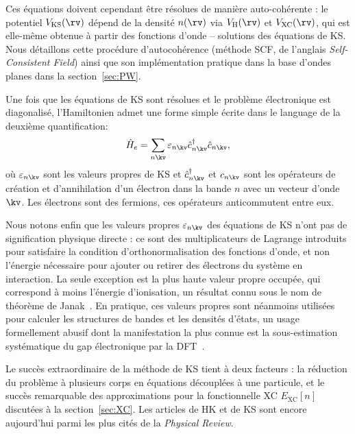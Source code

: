 Ces équations doivent cependant être résolues de manière auto-cohérente : le potentiel $V_\text{KS}(\rv)$ dépend de la densité $n(\rv)$ via $V_\text{H}(\rv)$ et $V_\text{XC}(\rv)$, qui est elle-même obtenue à partir des fonctions d'onde -- solutions des équations de KS. Nous détaillons cette procédure d'autocohérence (méthode SCF, de l'anglais \textit{Self-Consistent Field}) ainsi que son implémentation pratique dans la base d'ondes planes dans la section~\ref{sec:PW}.

Une fois que les équations de KS sont résolues et le problème électronique est diagonalisé, l'Hamiltonien admet une forme simple écrite dans le language de la deuxième quantification:
\begin{equation}
    \hat{H}_e = \sum_{n\kv}\varepsilon_{n\kv}\hat{c}^\dag_{n\kv}\hat{c}_{n\kv},
\end{equation}
où $\varepsilon_{n\kv}$ sont les valeurs propres de KS et $\hat{c}^\dag_{n\kv}$ et $c_{n\kv}$ sont les opérateurs de création et d'annihilation d'un électron dans la bande $n$ avec un vecteur d'onde $\kv$. Les électrons sont des fermions, ces opérateurs anticommutent entre eux. 

Nous notons enfin que les valeurs propres $\varepsilon_{n\kv}$ des équations de KS n'ont pas de signification physique directe : ce sont des multiplicateurs de Lagrange introduits pour satisfaire la condition d'orthonormalisation des fonctions d'onde, et non l'énergie nécessaire pour ajouter ou retirer des électrons du système en interaction. La seule exception est la plus haute valeur propre occupée, qui correspond à moins l'énergie d'ionisation, un résultat connu sous le nom de théorème de Janak~\cite{janakProof1978}. En pratique, ces valeurs propres sont néanmoins utilisées pour calculer les structures de bandes et les densités d'états, un usage formellement abusif dont la manifestation la plus connue est la sous-estimation systématique du gap électronique par la DFT~\cite{perdewPhysicalContentExact1983,shamDensityFunctionalTheoryEnergy1983}.

Le succès extraordinaire de la méthode de KS tient à deux facteurs : la réduction du problème à plusieurs corps en équations découplées à une particule, et le succès remarquable des approximations pour la fonctionnelle XC $E_\text{XC}[n]$ discutées à la section~\ref{sec:XC}. Les articles de HK \cite{hohenbergInhomogeneousElectronGas1964} et de KS \cite{kohnSelfConsistentEquationsIncluding1965} sont encore aujourd'hui parmi les plus cités de la \textit{Physical Review}.

